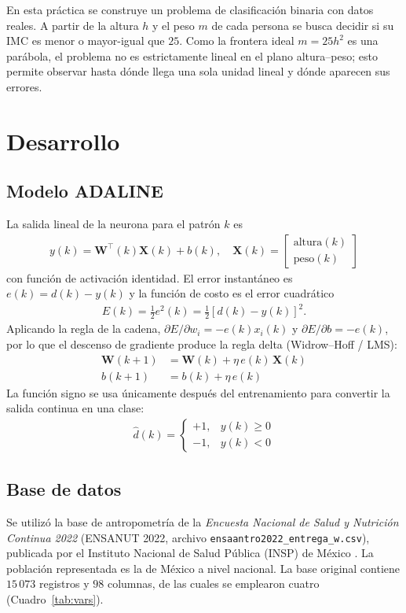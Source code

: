 \documentclass[conference]{IEEEtran}
\begin{document}
En esta práctica se construye un problema de clasificación binaria con datos
reales. A partir de la altura $h$ y el peso $m$ de cada persona se busca
decidir si su IMC es menor o mayor-igual que $25$. Como la frontera ideal
$m=25h^2$ es una parábola, el problema no es estrictamente lineal en el plano
altura--peso; esto permite observar hasta dónde llega una sola unidad lineal y
dónde aparecen sus errores.

\section{Desarrollo}

\subsection{Modelo ADALINE}
La salida lineal de la neurona para el patrón $k$ es
\begin{align}
    \label{eq:salida}
    y(k) = \mathbf{W}^\top(k)\mathbf{X}(k) + b(k),\quad
    \mathbf{X}(k)=\begin{bmatrix}\text{altura}(k)\\ \text{peso}(k)\end{bmatrix}
\end{align}
con función de activación identidad. El error instantáneo es
$e(k)=d(k)-y(k)$ y la función de costo es el error cuadrático
\begin{align}
    \label{eq:costo}
    E(k)=\tfrac{1}{2}e^2(k)=\tfrac{1}{2}\left[d(k)-y(k)\right]^2.
\end{align}
Aplicando la regla de la cadena,
$\partial E/\partial w_i = -e(k)x_i(k)$ y $\partial E/\partial b=-e(k)$, por lo que
el descenso de gradiente produce la regla delta (Widrow--Hoff / LMS):
\begin{align}
    \label{eq:deltaW}
    \mathbf{W}(k+1) &= \mathbf{W}(k) + \eta\, e(k)\,\mathbf{X}(k)\\
    \label{eq:deltab}
    b(k+1) &= b(k) + \eta\, e(k)
\end{align}
La función signo se usa únicamente después del entrenamiento para convertir la
salida continua en una clase:
\begin{align}
    \label{eq:signo}
    \hat{d}(k)=\begin{cases}+1, & y(k)\geq 0\\ -1, & y(k)<0\end{cases}
\end{align}

\subsection{Base de datos}
Se utilizó la base de antropometría de la \textit{Encuesta Nacional de Salud y
Nutrición Continua 2022} (ENSANUT 2022, archivo
\texttt{ensaantro2022\_entrega\_w.csv}), publicada por el Instituto Nacional de
Salud Pública (INSP) de México \cite{b6}. La población representada es la de
México a nivel nacional. La base original contiene $15\,073$ registros y
$98$ columnas, de las cuales se emplearon cuatro (Cuadro~\ref{tab:vars}).
\end{document}
